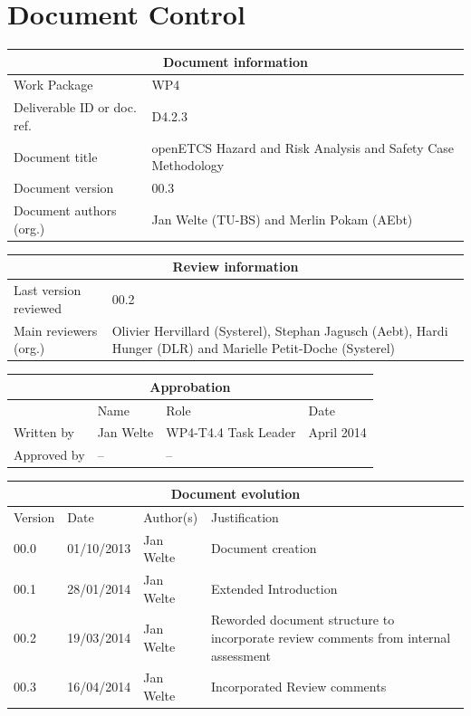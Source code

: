 \documentclass{template/openetcs_report}
\begin{document}
\maketitle
\tableofcontents
\listoffiguresandtables
\newpage

\chapter{Document Control}

\begin{tabular}{|p{4.4cm}|p{8.7cm}|}
\hline
\multicolumn{2}{|c|}{Document information} \\
\hline
Work Package &  WP4  \\
Deliverable ID or doc. ref. & D4.2.3\\
\hline
Document title & openETCS Hazard and Risk Analysis and Safety Case Methodology \\
Document version & 00.3 \\
Document authors (org.)  & Jan Welte (TU-BS) and Merlin Pokam (AEbt)\\
\hline
\end{tabular}

\begin{tabular}{|p{4.4cm}|p{8.7cm}|}
\hline
\multicolumn{2}{|c|}{Review information} \\
\hline
Last version reviewed & 00.2 \\
\hline
Main reviewers (org.) & Olivier Hervillard	(Systerel), Stephan Jagusch (Aebt), Hardi Hunger (DLR) and Marielle Petit-Doche (Systerel) \\
\hline
\end{tabular}

\begin{tabular}{|p{2.2cm}|p{4cm}|p{4cm}|p{2cm}|}
\hline
\multicolumn{4}{|c|}{Approbation} \\
\hline
  &  Name & Role & Date   \\
\hline  
Written by    &  Jan Welte & WP4-T4.4 Task Leader  &  April 2014\\
\hline
Approved by & -- & -- & \\
\hline
\end{tabular}

\begin{tabular}{|p{2.2cm}|p{2cm}|p{3cm}|p{5cm}|}
\hline
\multicolumn{4}{|c|}{Document evolution} \\
\hline
Version &  Date & Author(s) & Justification  \\
\hline
00.0 & 01/10/2013 & Jan Welte &  Document creation \\
\hline  
00.1 & 28/01/2014 & Jan Welte &  Extended Introduction  \\
00.2 & 19/03/2014 & Jan Welte &  Reworded document structure to incorporate review comments from internal assessment \\
00.3 & 16/04/2014 & Jan Welte &  Incorporated Review comments \\
\hline  
\end{tabular}
\newpage
\end{document}
